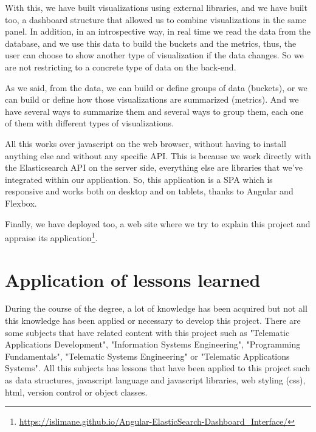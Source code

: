 \documentclass[a4paper, 12pt, english]{book}
\begin{document}
With this, we have built visualizations using external libraries, and we have built too, a dashboard structure that allowed us to combine visualizations in the same panel. In addition, in an introspective way, in real time we read the data from the database, and we use this data to build the buckets and the metrics, thus, the user can choose to show another type of visualization if the data changes. So we are not restricting to a concrete type of data on the back-end.

As we said, from the data, we can build or define groups of data (buckets), or we can build or define how those visualizations are summarized (metrics). And we have several ways to summarize them and several ways to group them, each one of them with different types of visualizations.

All this works over javascript on the web browser, without having to install anything else and without any specific API. This is because we work directly with the Elasticsearch API on the server side, everything else are libraries that we've integrated within our application. So, this application is a SPA which is responsive and works both on desktop and on tablets, thanks to Angular and Flexbox.

Finally, we have deployed too, a web site where we try to explain this project and appraise its application\footnote{\url{https://islimane.github.io/Angular-ElasticSearch-Dashboard_Interface/}}.




\section{Application of lessons learned}
\label{sec:application-of-lessons-learned}
During the course of the degree, a lot of knowledge has been acquired but not all this knowledge has been applied or necessary to develop this project. There are some subjects that have related content with this project such as "Telematic Applications Development", "Information Systems Engineering", "Programming Fundamentals", "Telematic Systems Engineering" or "Telematic Applications Systems". All this subjects has lessons that have been applied to this project such as data structures, javascript language and javascript libraries, web styling (css), html, version control or object classes.
\end{document}
